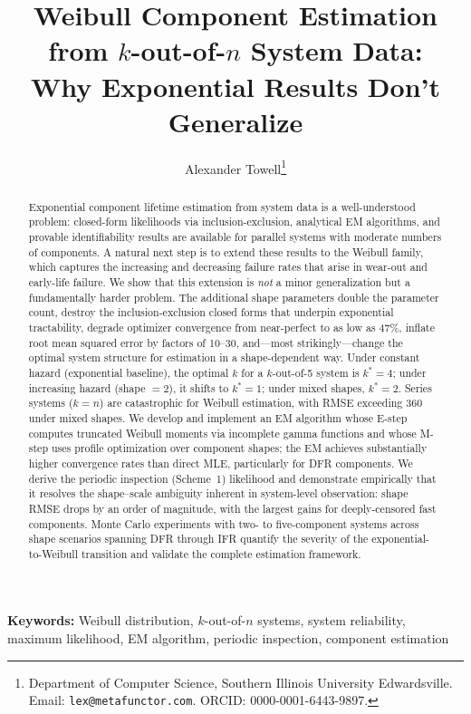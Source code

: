 \documentclass[12pt]{article}
\title{Weibull Component Estimation from $k$-out-of-$n$ System Data:\\
  Why Exponential Results Don't Generalize}
\author{Alexander Towell\thanks{Department of Computer Science,
  Southern Illinois University Edwardsville.
  Email: \texttt{lex@metafunctor.com}.
  ORCID: 0000-0001-6443-9897.}}
\date{}
\theoremstyle{definition}
\theoremstyle{remark}
\begin{document}
\maketitle

\begin{abstract}
Exponential component lifetime estimation from system data is a
well-understood problem: closed-form likelihoods via
inclusion-exclusion, analytical EM algorithms, and provable
identifiability results are available for parallel systems with
moderate numbers of components.  A natural next step is to extend
these results to the Weibull family, which captures the increasing
and decreasing failure rates that arise in wear-out and early-life
failure.  We show that this extension is \emph{not} a minor
generalization but a fundamentally harder problem.  The additional
shape parameters double the parameter count, destroy the
inclusion-exclusion closed forms that underpin exponential
tractability, degrade optimizer convergence from near-perfect to as
low as 47\%, inflate root mean squared error by factors of 10--30,
and---most strikingly---change the optimal system structure for
estimation in a shape-dependent way.  Under constant hazard
(exponential baseline), the optimal $k$ for a $k$-out-of-5 system
is $k^* = 4$; under increasing hazard (shape $= 2$), it shifts to
$k^* = 1$; under mixed shapes, $k^* = 2$.  Series systems
($k = n$) are catastrophic for Weibull estimation, with RMSE
exceeding 360 under mixed shapes.  We develop and implement an EM
algorithm whose E-step computes truncated Weibull moments via
incomplete gamma functions and whose M-step uses profile
optimization over component shapes; the EM achieves substantially
higher convergence rates than direct MLE, particularly for DFR
components.  We derive the periodic inspection (Scheme~1) likelihood
and demonstrate empirically that it resolves the shape--scale
ambiguity inherent in system-level observation: shape RMSE drops by
an order of magnitude, with the largest gains for deeply-censored
fast components.  Monte Carlo experiments with two- to
five-component systems across shape scenarios spanning DFR through
IFR quantify the severity of the exponential-to-Weibull transition
and validate the complete estimation framework.
\end{abstract}

\noindent\textbf{Keywords:} Weibull distribution,
$k$-out-of-$n$ systems, system reliability, maximum likelihood,
EM algorithm, periodic inspection, component estimation

\end{document}
